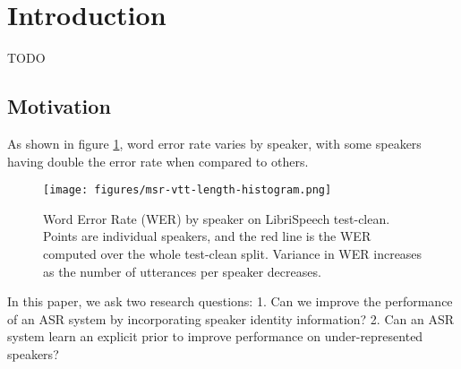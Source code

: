 \section{Introduction}

TODO
\subsection{Motivation}

As shown in figure \ref{fig:by_speaker}, word error rate varies by speaker, with some speakers having double the error rate when compared to others.

\begin{figure}[h]
      \centering
      \texttt{[image: figures/msr-vtt-length-histogram.png]}
      \caption{
          Word Error Rate (WER) by speaker on LibriSpeech test-clean. 
          Points are individual speakers, and the red line is the WER computed over the whole test-clean split.
          Variance in WER increases as the number of utterances per speaker decreases.
  }
      \label{fig:by_speaker}
\end{figure}

In this paper, we ask two research questions:
1. Can we improve the performance of an ASR system by incorporating speaker identity information?
2. Can an ASR system learn an explicit prior to improve performance on under-represented speakers?

